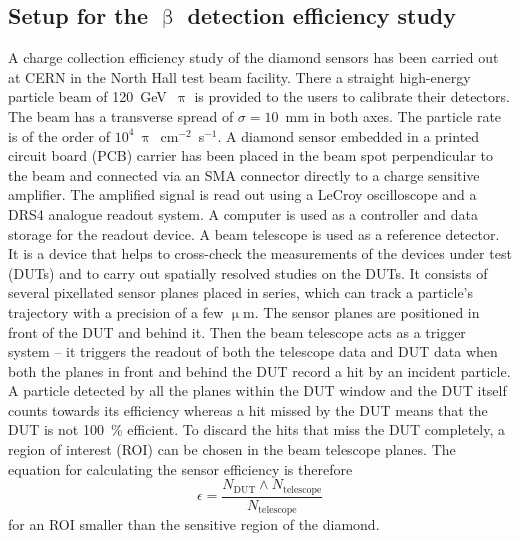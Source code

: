 \subsection{Setup for the $\upbeta$ detection efficiency study}
A charge collection efficiency study of the diamond sensors has been carried out at CERN in the North Hall test beam facility. There a straight high-energy particle beam of 120~GeV~$\uppi$ is provided to the users to calibrate their detectors. The beam has a transverse spread of $\sigma=10$~mm in both axes. The particle rate is of the order of $10^4~\uppi$~cm$^{-2}$~s$^{-1}$. A diamond sensor embedded in a printed circuit board (PCB) carrier has been placed in the beam spot perpendicular to the beam and connected via an SMA connector directly to a charge sensitive amplifier. The amplified signal is read out using a LeCroy oscilloscope and a DRS4 analogue readout system. A computer is used as a controller and data storage for the readout device. A beam telescope is used as a reference detector. It is a device that helps to cross-check the measurements of the devices under test (DUTs) and to carry out spatially resolved studies on the DUTs. It consists of several pixellated sensor planes placed in series, which can track a particle's trajectory with a precision of a few $\upmu$m. The sensor planes are positioned in front of the DUT and behind it. Then the beam telescope acts as a trigger system -- it triggers the readout of both the telescope data and DUT data when both the planes in front and behind the DUT record a hit by an incident particle. A particle detected by all the planes within the DUT window and the DUT itself counts towards its efficiency whereas a hit missed by the DUT means that the DUT is not 100~\% efficient. To discard the hits that miss the DUT completely, a region of interest (ROI) can be chosen in the beam telescope planes. The equation for calculating the sensor efficiency is therefore
\begin{equation}
\label{eq:sensoreff}
\epsilon = \frac{ N_\mathrm{DUT} \wedge N_\mathrm{telescope} }{ N_\mathrm{telescope} }
\end{equation}
for an ROI smaller than the sensitive region of the diamond.


